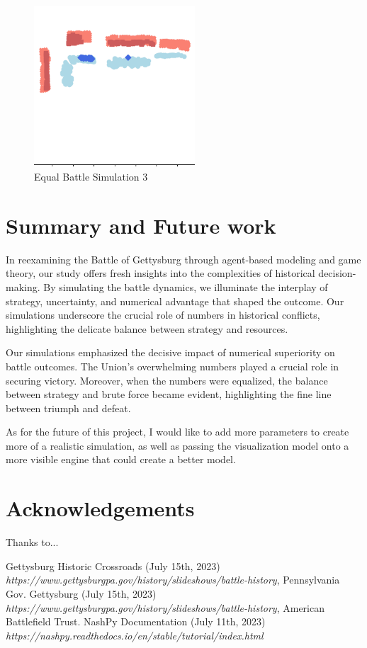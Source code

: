 \documentclass[final,5p,times,twocolumn,authoryear]{elsarticle}
\begin{document}
\begin{figure}[!ht]
  \centering
      \includegraphics[width=6cm]{Equal_battle_3.png}
      \caption{Equal Battle Simulation 3}
      \label{fig:Simulation}
  \centering
\end{figure}

\section{Summary and Future work}
In reexamining the Battle of Gettysburg through agent-based modeling and game theory, our study offers fresh insights into the complexities of historical decision-making. By simulating the battle dynamics, we illuminate the interplay of strategy, uncertainty, and numerical advantage that shaped the outcome. Our simulations underscore the crucial role of numbers in historical conflicts, highlighting the delicate balance between strategy and resources.

Our simulations emphasized the decisive impact of numerical superiority on battle outcomes. The Union's overwhelming numbers played a crucial role in securing victory. Moreover, when the numbers were equalized, the balance between strategy and brute force became evident, highlighting the fine line between triumph and defeat.

As for the future of this project, I would like to add more parameters to create more of a realistic simulation, as well as passing the visualization model onto a more visible engine that could create a better model.


\section*{Acknowledgements}
Thanks to...

 
\begin{thebibliography}{9}
\bibitem  Gettysburg Historic Crossroads (July 15th, 2023) \emph {https://www.gettysburgpa.gov/history/slideshows/battle-history}, Pennsylvania Gov.
\bibitem  Gettysburg (July 15th, 2023) \emph {https://www.gettysburgpa.gov/history/slideshows/battle-history}, American Battlefield Trust.
\bibitem  NashPy Documentation (July 11th, 2023) \emph{https://nashpy.readthedocs.io/en/stable/tutorial/index.html}
\end{thebibliography}





\end{document}
